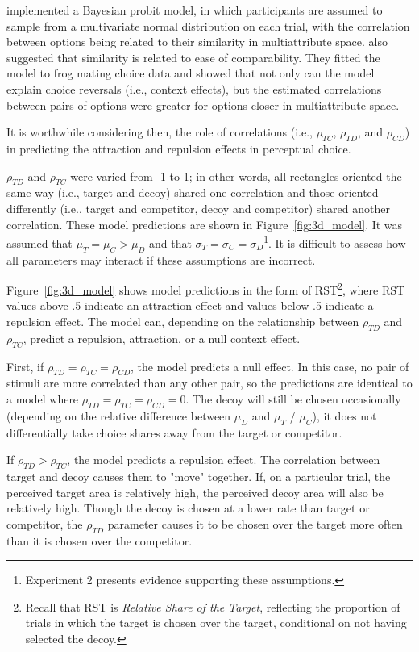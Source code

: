 \textcite{natenzon2019random} implemented a Bayesian probit model, in which participants are assumed to sample from a multivariate normal distribution on each trial, with the correlation between options being related to their similarity in multiattribute space. \textcite{natenzon2019random} also suggested that similarity is related to ease of comparability. They fitted the model to frog mating choice data and showed that not only can the model explain choice reversals (i.e., context effects), but the estimated correlations between pairs of options were greater for options closer in multiattribute space. 

It is worthwhile considering then, the role of correlations (i.e., $\rho_{TC}$, $\rho_{TD}$, and $\rho_{CD}$) in predicting the attraction and repulsion effects in perceptual choice. 

$\rho_{TD}$ and $\rho_{TC}$ were varied from -1 to 1; in other words, all rectangles oriented the same way (i.e., target and decoy) shared one correlation and those oriented differently (i.e., target and competitor, decoy and competitor) shared another correlation. These model predictions are shown in Figure~\ref{fig:3d_model}. It was assumed that $\mu_{T}=\mu_{C}>\mu_{D}$ and that $\sigma_{T}=\sigma_{C}=\sigma_{D}$\footnote{Experiment 2 presents evidence supporting these assumptions.}. It is difficult to assess how all parameters may interact if these assumptions are incorrect. 

Figure~\ref{fig:3d_model} shows model predictions in the form of RST\footnote{Recall that RST is \textit{Relative Share of the Target}, reflecting the proportion of trials in which the target is chosen over the target, conditional on not having selected the decoy.}, where RST values above .5 indicate an attraction effect and values below .5 indicate a repulsion effect. The model can, depending on the relationship between $\rho_{TD}$ and $\rho_{TC}$, predict a repulsion, attraction, or a null context effect. 

First, if $\rho_{TD}=\rho_{TC}=\rho_{CD}$, the model predicts a null effect. In this case, no pair of stimuli are more correlated than any other pair, so the predictions are identical to a model where $\rho_{TD}=\rho_{TC}=\rho_{CD}=0$. The decoy will still be chosen occasionally (depending on the relative difference between $\mu_{D}$ and $\mu_{T}$ / $\mu_{C}$), it does not differentially take choice shares away from the target or competitor. 

If $\rho_{TD}>\rho_{TC}$, the model predicts a repulsion effect. The correlation between target and decoy causes them to "move" together. If, on a particular trial, the perceived target area is relatively high, the perceived decoy area will also be relatively high. Though the decoy is chosen at a lower rate than target or competitor, the $\rho_{TD}$ parameter causes it to be chosen over the target more often than it is chosen over the competitor.  

